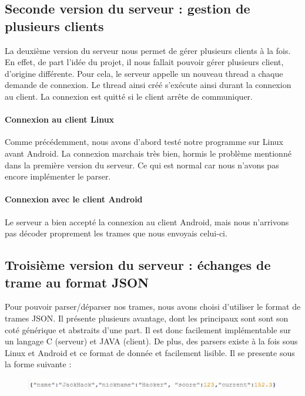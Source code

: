 \documentclass[a4paper,10pt]{article}
\begin{document}
\subsection{Seconde version du serveur : gestion de plusieurs clients}
La deuxième version du serveur nous permet de gérer plusieurs clients à la fois. En effet, de part l'idée du projet, il nous fallait pouvoir gérer plusieurs client, d'origine différente. Pour cela, le serveur appelle un nouveau thread a chaque demande de connexion. Le thread ainsi créé s'exécute ainsi durant la connexion au client. La connexion est quitté si le client arrête de communiquer. 

\paragraph{Connexion au client Linux}
Comme précédemment, nous avons d'abord testé notre programme sur Linux avant Android. La connexion marchais très bien, hormis le problème mentionné dans la première version du serveur. Ce qui est normal car nous n'avons pas encore implémenter le parser.

\paragraph{Connexion avec le client Android}
Le serveur a bien accepté la connexion au client Android, mais nous n'arrivons pas décoder proprement les trames que nous envoyais celui-ci.

\subsection{Troisième version du serveur : échanges de trame au format JSON}

Pour pouvoir parser/déparser nos trames, nous avons choisi d'utiliser  le format de trames JSON. Il présente plusieurs avantage, dont les principaux sont sont son coté générique et abstraits d'une part. Il est donc facilement implémentable sur un langage C (serveur) et JAVA (client). De plus, des parsers existe à la fois sous Linux et Android et ce format de donnée et facilement lisible. Il se presente sous la forme suivante :
\begin{figure}[H]
\centering\includegraphics[scale=0.7]{images/JSON_trame.jpg}
\end{figure}
\end{document}
